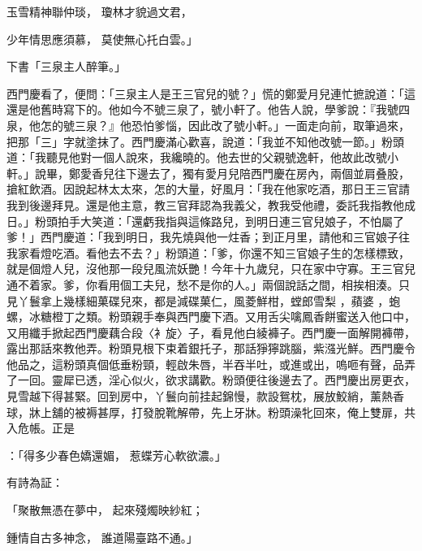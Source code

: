 玉雪精神聯仲琰，  瓊林才貌過文君，

少年情思應須慕，  莫使無心托白雲。」

下書「三泉主人醉筆。」

西門慶看了，便問：「三泉主人是王三官兒的號？」慌的鄭愛月兒連忙摭說道：「這還是他舊時寫下的。他如今不號三泉了，號小軒了。他告人說，學爹說：『我號四泉，他怎的號三泉？』他恐怕爹惱，因此改了號小軒。」一面走向前，取筆過來，把那「三」字就塗抹了。西門慶滿心歡喜，說道：「我並不知他改號一節。」粉頭道：「我聽見他對一個人說來，我纔曉的。他去世的父親號逸軒，他故此改號小軒。」說畢，鄭愛香兒往下邊去了，獨有愛月兒陪西門慶在房內，兩個並肩叠股，搶紅飲酒。因說起林太太來，怎的大量，好風月：「我在他家吃酒，那日王三官請我到後邊拜見。還是他主意，教三官拜認為我義父，教我受他禮，委託我指教他成日。」粉頭拍手大笑道：「還虧我指與這條路兒，到明日連三官兒娘子，不怕屬了爹！」西門慶道：「我到明日，我先燒與他一炷香；到正月里，請他和三官娘子往我家看燈吃酒。看他去不去？」粉頭道：「爹，你還不知三官娘子生的怎樣標致，就是個燈人兒，沒他那一段兒風流妖艷！今年十九歲兒，只在家中守寡。王三官兒通不着家。爹，你看用個工夫兒，愁不是你的人。」兩個說話之間，相挨相湊。只見丫鬟拿上幾樣細菓碟兒來，都是減碟菓仁，風菱鮮柑，螳郎雪梨 ，蘋婆 ，蚫螺，冰糖橙丁之類。粉頭親手奉與西門慶下酒。又用舌尖噙鳳香餅蜜送入他口中，又用纖手掀起西門慶藕合段〈衤旋〉子，看見他白綾褲子。西門慶一面解開褲帶，露出那話來教他弄。粉頭見根下束着銀托子，那話猙獰跳腦，紫漒光鮮。西門慶令他品之，這粉頭真個低垂粉頸，輕啟朱唇，半吞半吐，或進或出，嗚咂有聲，品弄了一回。靈犀已透，淫心似火，欲求講歡。粉頭便往後邊去了。西門慶出房更衣，見雪越下得甚緊。回到房中，丫鬟向前挂起錦慢，款設鴛枕，展放鮫綃，薰熱香球，牀上舖的被褥甚厚，打發脫靴解帶，先上牙牀。粉頭澡牝回來，俺上雙扉，共入危帳。正是

：「得多少春色嬌還媚， 惹蝶芳心軟欲濃。」

有詩為証：

「聚散無憑在夢中，  起來殘燭映紗紅；

鍾情自古多神念，  誰道陽臺路不通。」

